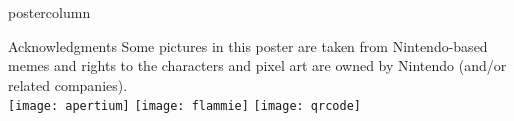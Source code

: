 \documentclass[final,hyperref={pdfpagelabels}]{beamer}
\begin{document}
\begin{frame}
\begin{columns}
\begin{column}{.49\textwidth}
\begin{beamercolorbox}[center,wd=\textwidth]{postercolumn}
\begin{minipage}[T]{.95\textwidth}
{\begin{block}{Acknowledgments}
            Some pictures in this poster are taken from Nintendo-based memes and
            rights to the characters and pixel art are owned by Nintendo (and/or
            related companies).
            \\
            \texttt{[image: apertium]}
            \texttt{[image: flammie]}
            \texttt{[image: qrcode]}
        \end{block}
         }
        \end{minipage}
      \end{beamercolorbox}
    \end{column}
  \end{columns}

  \end{frame}
\end{document}
